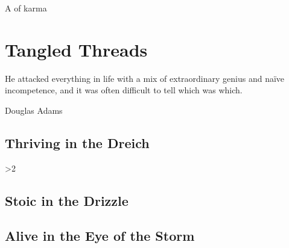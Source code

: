 \documentclass[a4paper,openany]{book}
\begin{document}
%
  {A  of karma}%

\glsunsetall


\printglossary[
  style=topicmcols,
]

\printglossary[
  type=mech,
  style=topicmcols,
  nonumberlist,
  ]

\printglossary[
  type=symbols,
  ]


\mainmatter




\glsresetall
\clearpage


\chapter{Tangled Threads}
  \epigraph{He attacked everything in life with a mix of extraordinary genius and na\"ive incompetence, and it was often difficult to tell which was which.}{Douglas Adams}
\label{threads}

\section{Thriving in the Dreich}
\begin{multicols}{2}
\ifnum\value{cycle}>2
  
  
  
  
\else
  
  
  
  
  
\fi
\end{multicols}

\section{Stoic in the Drizzle}
\begin{multicols}{2}



\end{multicols}

\section{Alive in the Eye of the Storm}
\end{document}
